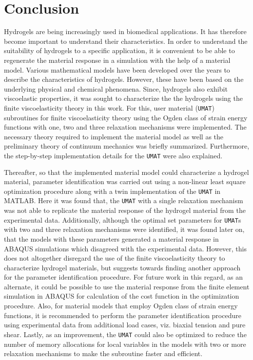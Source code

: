 \chapter{Conclusion}
Hydrogels are being increasingly used in biomedical applications. It has therefore become important to understand their characteristics. In order to understand the suitability of hydrogels to a specific application, it is convenient to be able to regenerate the material response in a simulation with the help of a material model. Various mathematical models have been developed over the years to describe the characteristics of hydrogels. However, these have been based on the underlying physical and chemical phenomena. Since, hydrogels also exhibit viscoelastic properties, it was sought to characterize the the hydrogels using the finite viscoelasticity theory in this work. For this, user material (\texttt{UMAT}) subroutines for finite viscoelasticity theory using the Ogden class of strain energy functions with one, two and three relaxation mechanisms were implemented. The necessary theory required to implement the material model as well as the preliminary theory of continuum mechanics was briefly summarized. Furthermore, the step-by-step implementation details for the \texttt{UMAT} were also explained. 

Thereafter, so that the implemented material model could characterize a hydrogel material, parameter identification was carried out using a non-linear least square optimization procedure along with a twin implementation of the \texttt{UMAT} in MATLAB. Here it was found that, the \texttt{UMAT} with a single relaxation mechanism was not able to replicate the material response of the hydrogel material from the experimental data. Additionally, although the optimal set parameters for \texttt{UMAT}s with two and three relaxation mechanisms were identified, it was found later on, that the models with these parameters generated a material response in ABAQUS simulations which disagreed with the experimental data. However, this does not altogether disregard the use of the finite viscoelasticity theory to characterize hydrogel materials, but suggests towards finding another approach for the parameter identification procedure. For future work in this regard, as an alternate, it could be possible to use the material response from the finite element simulation in ABAQUS for calculation of the cost function in the optimization procedure. Also, for material models that employ Ogden class of strain energy functions, it is recommended to perform the parameter identification procedure using experimental data from additional load cases, viz. biaxial tension and pure shear. Lastly, as an improvement, the \texttt{UMAT} could also be optimized to reduce the number of memory allocations for local variables in the models with two or more relaxation mechanisms to make the subroutine faster and efficient.



